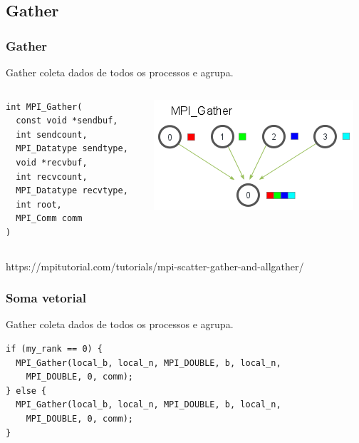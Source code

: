 \documentclass[xcolor={usenames,dvipsnames},12pt,presentation,aspectratio=169]{beamer}
\begin{document}
\subsection{Gather}
\begin{frame}[fragile]
  \frametitle{Gather}
Gather coleta dados de todos os processos e agrupa.
\begin{columns}
  \begin{column}{0.5\textwidth}
    \begin{center}
      \begin{minipage}{0.95\textwidth}
        \begin{verbatim}
int MPI_Gather(
  const void *sendbuf,
  int sendcount,
  MPI_Datatype sendtype,
  void *recvbuf,
  int recvcount,
  MPI_Datatype recvtype,
  int root,
  MPI_Comm comm
)
        \end{verbatim}
      \end{minipage}
      \end{center}    
  \end{column}
  \begin{column}{0.5\textwidth}
    \begin{center}
    \includegraphics[width=\textwidth]{gather.png}
    \end{center}       
  \end{column}
\end{columns}
{\tiny https://mpitutorial.com/tutorials/mpi-scatter-gather-and-allgather/}
\end{frame}
\begin{frame}[fragile]
  \frametitle{Soma vetorial}
  Gather coleta dados de todos os processos e agrupa.
\begin{center}
\begin{minipage}{0.95\textwidth}
  \begin{verbatim}
if (my_rank == 0) {
  MPI_Gather(local_b, local_n, MPI_DOUBLE, b, local_n,
    MPI_DOUBLE, 0, comm);
} else {
  MPI_Gather(local_b, local_n, MPI_DOUBLE, b, local_n,
    MPI_DOUBLE, 0, comm);
}
  \end{verbatim}
\end{minipage}
\end{center}
\end{frame}
\end{document}

